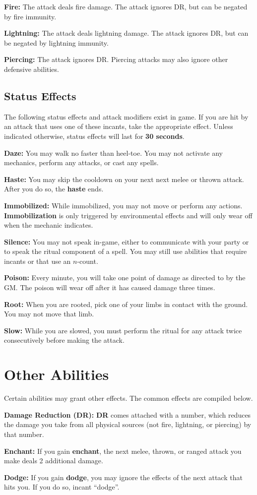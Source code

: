 \documentclass[green]{grimrock}
\begin{document}
{\bf Fire:} The attack deals fire damage.  The attack ignores DR, but can be negated by fire immunity.

{\bf Lightning:} The attack deals lightning damage.  The attack ignores DR, but can be negated by lightning immunity.

{\bf Piercing:} The attack ignores DR.  Piercing attacks may also ignore other defensive abilities.


\subsection{Status Effects}

The following status effects and attack modifiers exist in game.  If you are hit by an attack that uses one of these incants, take the appropriate effect.  Unless indicated otherwise, status effects will last for {\bf 30 seconds}.

{\bf Daze:} You may walk no faster than heel-toe.  You may not activate any mechanics, perform any attacks, or cast any spells.


{\bf Haste:} You may skip the cooldown on your next next melee or thrown attack.  After you do so, the {\bf haste} ends.

{\bf Immobilized:}  While immobilized, you may not move or perform any actions.  {\bf Immobilization} is only triggered by environmental effects and will only wear off when the mechanic indicates.

{\bf Silence:} You may not speak in-game, either to communicate with your party or to speak the ritual component of a spell.  You may still use abilities that require incants or that use an $n$-count.

{\bf Poison:}  Every minute, you will take one point of damage as directed to by the GM.  The poison will wear off after it has caused damage three times.

{\bf Root:} When you are rooted, pick one of your  limbs in contact with the ground.  You may not move that limb.

{\bf Slow:} While you are slowed, you must perform the ritual for any attack twice consecutively before making the attack.

\section{Other Abilities}

Certain abilities may grant other effects.  The common effects are compiled below.

{\bf Damage Reduction (DR):} {\bf DR} comes attached with a number, which reduces the damage you take from all physical sources (not fire, lightning, or piercing) by that number.

{\bf Enchant:} If you gain {\bf enchant}, the next melee, thrown, or ranged attack you make deals 2 additional damage.

{\bf Dodge:} If you gain {\bf dodge}, you may ignore the effects of the next attack that hits you.  If you do so, incant ``dodge''.



\end{document}
